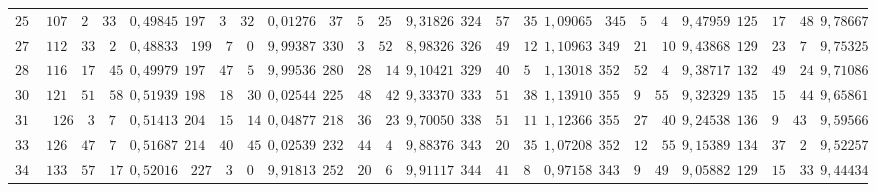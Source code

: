 \begin{landscape}
\begin{center}
\begin{tabular}{r|r|r|r|r|r|r|r|r|r|r|r|r}
\(255\) & \(107\quad 2\quad 33\) & \(0{,}49845\) & \(197\quad 3\quad 32\) & \(0{,}01276\) & \(37\quad 5\quad 25\) & \(9{,}31826\) & \(324\quad 57\quad 35\) & \(1{,}09065\) & \(345\quad 5\quad 4\) & \(9{,}47959\) & \(125\quad 17\quad 48\) & \(9{,}78667\) \\
\(270\) & \(112\quad 33\quad 2\) & \(0{,}48833\) & \(199\quad 7\quad 0\) & \(9{,}99387\) & \(330\quad 3\quad 52\) & \(8{,}98326\) & \(326\quad 49\quad 12\) & \(1{,}10963\) & \(349\quad 21\quad 10\) & \(9{,}43868\) & \(129\quad 23\quad 7\) & \(9{,}75325\) \\
\(285\) & \(116\quad 17\quad 45\) & \(0{,}49979\) & \(197\quad 47\quad 5\) & \(9{,}99536\) & \(280\quad 28\quad 14\) & \(9{,}10421\) & \(329\quad 40\quad 5\) & \(1{,}13018\) & \(352\quad 52\quad 4\) & \(9{,}38717\) & \(132\quad 49\quad 24\) & \(9{,}71086\) \\[3pt]
\(300\) & \(121\quad 51\quad 58\) & \(0{,}51939\) & \(198\quad 18\quad 30\) & \(0{,}02544\) & \(225\quad 48\quad 42\) & \(9{,}33370\) & \(333\quad 51\quad 38\) & \(1{,}13910\) & \(355\quad 9\quad 55\) & \(9{,}32329\) & \(135\quad 15\quad 44\) & \(9{,}65861\) \\
\(315\) & \(126\quad 3\quad 7\) & \(0{,}51413\) & \(204\quad 15\quad 14\) & \(0{,}04877\) & \(218\quad 36\quad 23\) & \(9{,}70050\) & \(338\quad 51\quad 11\) & \(1{,}12366\) & \(355\quad 27\quad 40\) & \(9{,}24538\) & \(136\quad 9\quad 43\) & \(9{,}59566\) \\
\(330\) & \(126\quad 47\quad 7\) & \(0{,}51687\) & \(214\quad 40\quad 45\) & \(0{,}02539\) & \(232\quad 44\quad 4\) & \(9{,}88376\) & \(343\quad 20\quad 35\) & \(1{,}07208\) & \(352\quad 12\quad 55\) & \(9{,}15389\) & \(134\quad 37\quad 2\) & \(9{,}52257\) \\
\(345\) & \(133\quad 57\quad 17\) & \(0{,}52016\) & \(227\quad 3\quad 0\) & \(9{,}91813\) & \(252\quad 20\quad 6\) & \(9{,}91117\) & \(344\quad 41\quad 8\) & \(0{,}97158\) & \(343\quad 9\quad 49\) & \(9{,}05882\) & \(129\quad 15\quad 33\) & \(9{,}44434\) \\
\end{tabular}
\end{center}
\endgroup
\end{landscape}
